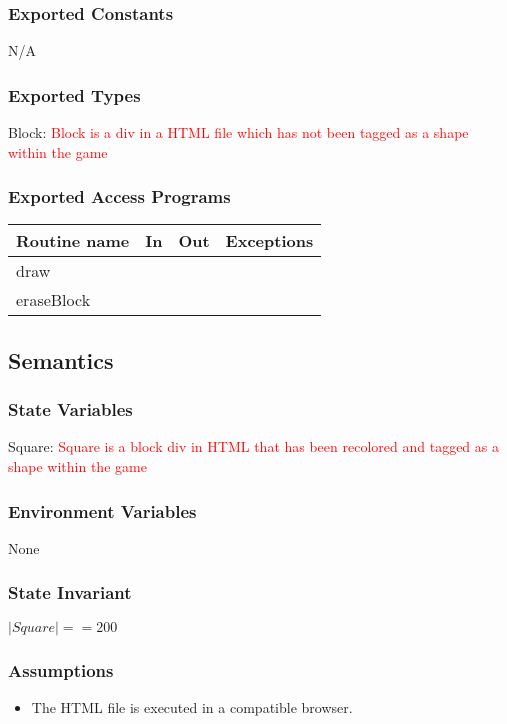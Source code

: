 \documentclass[12pt]{article}
\begin{document}
\subsubsection* {Exported Constants}
N/A
\subsubsection* {Exported Types}
Block: \textcolor{red}{Block is a div in a HTML file which has not been tagged as a shape within the game}

\subsubsection* {Exported Access Programs}

\begin{tabular}{| l | l | l | l |}
\hline
\textbf{Routine name} & \textbf{In} & \textbf{Out} & \textbf{Exceptions}\\
\hline
draw &  &  &  \\
\hline
eraseBlock & & & \\
\hline
\end{tabular}

\subsection* {Semantics}

\subsubsection* {State Variables}

Square: \textcolor{red}{Square is a block div in HTML that has been recolored and tagged as a shape within the game}


\subsubsection* {Environment Variables}
None
\subsubsection* {State Invariant}
$|Square| == 200 $

\subsubsection* {Assumptions}

\begin{itemize}
    \item The HTML file is executed in a compatible browser.
\end{itemize}
\end{document}
